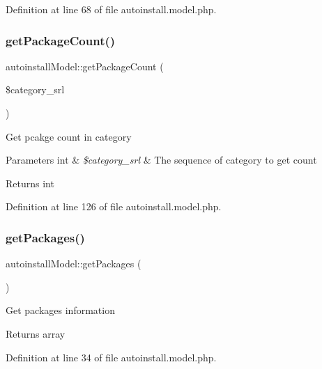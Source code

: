 Definition at line 68 of file autoinstall.\+model.\+php.

\mbox{\label{classautoinstallModel_a88e07f232668549a2b68478ad42f4005}} 
\subsubsection{\texorpdfstring{get\+Package\+Count()}{getPackageCount()}}
{\footnotesize\ttfamily autoinstall\+Model\+::get\+Package\+Count (\begin{DoxyParamCaption}\item[{}]{\$category\+\_\+srl }\end{DoxyParamCaption})}

Get pcakge count in category


\begin{DoxyParams}[1]{Parameters}
int & {\em \$category\+\_\+srl} & The sequence of category to get count \\
\hline
\end{DoxyParams}
\begin{DoxyReturn}{Returns}
int 
\end{DoxyReturn}


Definition at line 126 of file autoinstall.\+model.\+php.

\mbox{\label{classautoinstallModel_a32b3e83419ad1f9a01fc95ce8f8db795}} 
\subsubsection{\texorpdfstring{get\+Packages()}{getPackages()}}
{\footnotesize\ttfamily autoinstall\+Model\+::get\+Packages (\begin{DoxyParamCaption}{ }\end{DoxyParamCaption})}

Get packages information

\begin{DoxyReturn}{Returns}
array 
\end{DoxyReturn}


Definition at line 34 of file autoinstall.\+model.\+php.

